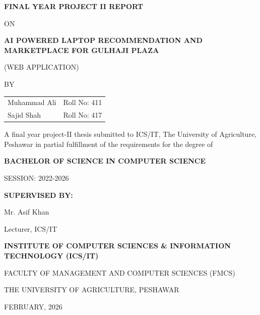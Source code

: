 \begin{titlepage}
\centering

\vspace*{1cm}

{\LARGE\bfseries FINAL YEAR PROJECT II REPORT\par}
\vspace{0.5cm}
{\large ON\par}
\vspace{0.5cm}
{\LARGE\bfseries AI POWERED LAPTOP RECOMMENDATION AND MARKETPLACE FOR GULHAJI PLAZA\par}
\vspace{0.3cm}
{\large (WEB APPLICATION)\par}

\vspace{1.5cm}

{\large BY\par}
\vspace{0.3cm}
\begin{tabular}{ll}
Muhammad Ali & Roll No: 411 \\
Sajid Shah   & Roll No: 417 \\
\end{tabular}

\vspace{1.5cm}

{\small A final year project-II thesis submitted to ICS/IT, The University of
Agriculture, Peshawar in partial fulfillment of the requirements for the degree of\par}

\vspace{0.5cm}
{\large\bfseries BACHELOR OF SCIENCE IN COMPUTER SCIENCE\par}
\vspace{0.3cm}
{\large SESSION: 2022-2026\par}

\vspace{1.5cm}

{\large\bfseries SUPERVISED BY:\par}
{\large Mr. Asif Khan\par}
{\small Lecturer, ICS/IT\par}

\vfill

{\large\bfseries INSTITUTE OF COMPUTER SCIENCES \& INFORMATION TECHNOLOGY (ICS/IT)\par}
{\small FACULTY OF MANAGEMENT AND COMPUTER SCIENCES (FMCS)\par}
{\small THE UNIVERSITY OF AGRICULTURE, PESHAWAR\par}
{\small FEBRUARY, 2026\par}

\end{titlepage}
